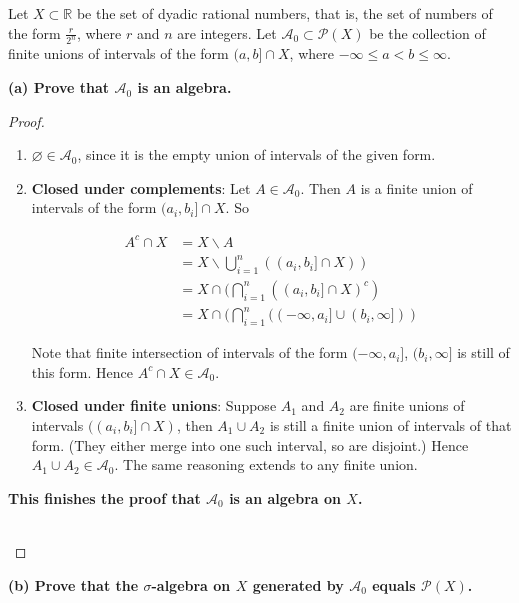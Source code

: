 \documentclass{qlnotes-export}
\begin{document}
Let \(X \subset {\mathbb{R}}\) be the set of dyadic rational numbers, that is, the set of numbers of the form \(\frac{r}{2^{n}}\), where \(r\) and \(n\) are integers. Let \(\mathcal{A}_{0} \subset \mathcal{P}(X)\) be the collection of finite unions of intervals of the form \((a,b\rbrack \cap X\), where \(- \infty \leq a < b \leq \infty\).

\textbf{(a) Prove that \(\mathcal{A}_{0}\) is an algebra.}

\begin{proof}

\begin{enumerate}
\item
  \(\varnothing \in \mathcal{A}_{0}\), since it is the empty union of intervals of the given form.
\item
  \textbf{Closed under complements}: Let \(A \in \mathcal{A}_{0}\). Then \(A\) is a finite union of intervals of the form \((a_{i},b_{i}\rbrack \cap X\). So

  \[\begin{matrix}
  {A^{c} \cap X} & {= X\backslash A} \\
   & {= X\backslash\bigcup\limits_{i = 1}^{n}((a_{i},b_{i}\rbrack \cap X))} \\
   & {= X \cap (\bigcap\limits_{i = 1}^{n}((a_{i},b_{i}\rbrack \cap X)^{c})} \\
   & {= X \cap (\bigcap\limits_{i = 1}^{n}(( - \infty,a_{i}\rbrack \cup (b_{i},\infty\rbrack))}
  \end{matrix}\]

  Note that finite intersection of intervals of the form \(( - \infty,a_{i}\rbrack\), \((b_{i},\infty\rbrack\) is still of this form. Hence \(A^{c} \cap X \in \mathcal{A}_{0}\).
\item
  \textbf{Closed under finite unions}: Suppose \(A_{1}\) and \(A_{2}\) are finite unions of intervals \(((a_{i},b_{i}\rbrack \cap X)\), then \(A_{1} \cup A_{2}\) is still a finite union of intervals of that form. (They either merge into one such interval, so are disjoint.) Hence \(A_{1} \cup A_{2} \in \mathcal{A}_{0}\). The same reasoning extends to any finite union.
\end{enumerate}

\textbf{This finishes the proof that \(\mathcal{A}_{0}\) is an algebra on \(X\).}\\
\strut \\

\end{proof}

\textbf{(b) Prove that the \(\sigma\)-algebra on \(X\) generated by \(\mathcal{A}_{0}\) equals \(\mathcal{P}(X)\).}
\end{document}
